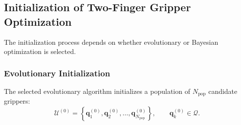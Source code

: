 
\subsection{Initialization of Two-Finger Gripper Optimization}
\label{sec:two_finger_initialization}

The initialization process depends on whether evolutionary or Bayesian optimization is selected.

\subsubsection{Evolutionary Initialization}

The selected evolutionary algorithm initializes a population of $N_{\mathrm{pop}}$ candidate
grippers:
\begin{equation}
    \mathcal{U}^{(0)}
    =
    \left\{
        \mathbf{q}^{(0)}_1,
        \mathbf{q}^{(0)}_2,
        \ldots,
        \mathbf{q}^{(0)}_{N_{\mathrm{pop}}}
    \right\},
    \qquad
    \mathbf{q}^{(0)}_k \in \mathcal{Q}.
\end{equation}

